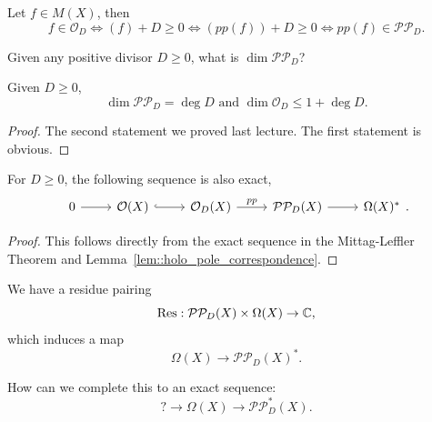 \documentclass{article}
\begin{document}
{\begin{lemma}\label{lem::holo_pole_correspondence}
    Let $f \in M(X)$, then
    \[f \in \mathcal{O}_D \iff (f) + D \geq 0 \iff (pp(f)) + D \geq 0 \iff pp(f) \in \mathcal{P}\mathcal{P}_D.\]
\end{lemma}

\begin{question}
    Given any positive divisor $D \geq 0$, what is $\dim \mathcal{P}\mathcal{P}_D$?
\end{question}

\begin{proposition}
Given $D \geq 0$,
    $$\dim \mathcal{P}\mathcal{P}_D = \deg D \text{ and } \dim \mathcal{O}_D \leq 1 + \deg D.$$
\end{proposition}

\begin{proof}
    The second statement we proved last lecture. The first statement is obvious.
\end{proof}

\begin{proposition}
For $D \geq 0$, the following sequence is also exact,
\[\begin{tikzcd}
	0 & {\mathcal{O}(X)} & {\mathcal{O}_D(X)} & {\mathcal{P}\mathcal{P}_D(X)} & {\Omega(X)^*}
	\arrow["pp", from=1-3, to=1-4]
	\arrow[from=1-1, to=1-2]
	\arrow[hook, from=1-2, to=1-3]
	\arrow[from=1-4, to=1-5]
\end{tikzcd}.\]
\end{proposition}

\begin{proof}
    This follows directly from the exact sequence in the Mittag-Leffler Theorem and Lemma~\ref{lem::holo_pole_correspondence}.
\end{proof}

We have a residue pairing
\[\operatorname{Res}: \mathcal{P} \mathcal{P}_D(X) \times \Omega(X) \to \mathbb{C},\]
which induces a map
\[\Omega(X) \to \mathcal{P}\mathcal{P}_D(X)^*.\]

\begin{question}
    How can we complete this to an exact sequence:
    \[? \to \Omega(X) \to \mathcal{P} \mathcal{P}^*_D(X).\]
\end{question}

}
\end{document}
